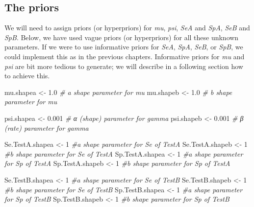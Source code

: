 \documentclass[
]{book}
\newenvironment{Shaded}{\begin{snugshade}}{\end{snugshade}}
\newcommand{\CommentTok}[1]{\textcolor[rgb]{0.56,0.35,0.01}{\textit{#1}}}
\newcommand{\DecValTok}[1]{\textcolor[rgb]{0.00,0.00,0.81}{#1}}
\newcommand{\FloatTok}[1]{\textcolor[rgb]{0.00,0.00,0.81}{#1}}
\newcommand{\NormalTok}[1]{#1}
\newcommand{\OtherTok}[1]{\textcolor[rgb]{0.56,0.35,0.01}{#1}}
\begin{document}
\subsection{The priors}\label{the-priors}

We will need to assign priors (or hyperpriors) for \emph{mu}, \emph{psi}, \emph{SeA} and \emph{SpA}, \emph{SeB} and \emph{SpB}. Below, we have used vague priors (or hyperpriors) for all these unknown parameters. If we were to use informative priors for \emph{SeA}, \emph{SpA}, \emph{SeB}, or \emph{SpB}, we could implement this as in the previous chapters. Informative priors for \emph{mu} and \emph{psi} are bit more tedious to generate; we will describe in a following section how to achieve this.

\begin{Shaded}
\begin{Highlighting}[]
\NormalTok{mu.shapea }\OtherTok{\textless{}{-}} \FloatTok{1.0}           \CommentTok{\# a shape parameter for mu}
\NormalTok{mu.shapeb }\OtherTok{\textless{}{-}} \FloatTok{1.0}           \CommentTok{\# b shape parameter for mu}

\NormalTok{psi.shapea }\OtherTok{\textless{}{-}} \FloatTok{0.001}        \CommentTok{\# α (shape) parameter for gamma}
\NormalTok{psi.shapeb }\OtherTok{\textless{}{-}} \FloatTok{0.001}        \CommentTok{\# β (rate) parameter for gamma}

\NormalTok{Se.TestA.shapea }\OtherTok{\textless{}{-}} \DecValTok{1}       \CommentTok{\#a shape parameter for Se of TestA}
\NormalTok{Se.TestA.shapeb }\OtherTok{\textless{}{-}} \DecValTok{1}       \CommentTok{\#b shape parameter for Se of TestA}
\NormalTok{Sp.TestA.shapea }\OtherTok{\textless{}{-}} \DecValTok{1}       \CommentTok{\#a shape parameter for Sp of TestA}
\NormalTok{Sp.TestA.shapeb }\OtherTok{\textless{}{-}} \DecValTok{1}       \CommentTok{\#b shape parameter for Sp of TestA}

\NormalTok{Se.TestB.shapea }\OtherTok{\textless{}{-}} \DecValTok{1}       \CommentTok{\#a shape parameter for Se of TestB}
\NormalTok{Se.TestB.shapeb }\OtherTok{\textless{}{-}} \DecValTok{1}       \CommentTok{\#b shape parameter for Se of TestB}
\NormalTok{Sp.TestB.shapea }\OtherTok{\textless{}{-}} \DecValTok{1}       \CommentTok{\#a shape parameter for Sp of TestB}
\NormalTok{Sp.TestB.shapeb }\OtherTok{\textless{}{-}} \DecValTok{1}       \CommentTok{\#b shape parameter for Sp of TestB}
\end{Highlighting}
\end{Shaded}
\end{document}
